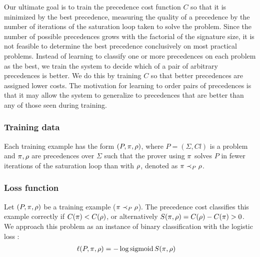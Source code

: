 Our ultimate goal is to train the precedence cost function $C$ so that it is minimized by the best precedence,
measuring the quality of a precedence by the number of iterations of the saturation loop taken to solve the problem.
Since the number of possible precedences grows with the factorial of the signature size,
it is not feasible to determine the best precedence conclusively on most practical problems.
Instead of learning to classify one or more precedences on each problem as the best,
we train the system to decide which of a pair of arbitrary precedences is better.
We do this by training $C$ so that better precedences are assigned lower costs.
The motivation for learning to order pairs of precedences
is that it may allow the system to generalize to precedences that are better than any of those seen during training.

\subsubsection{Training data}

Each training example has the form $(P, \pi, \rho)$,
where $P = (\Sigma, \mathit{Cl})$ is a problem
and $\pi, \rho$ are precedences over $\Sigma$
such that the prover using $\pi$ solves $P$ in fewer iterations of the saturation loop than with $\rho$,
denoted as $\pi \prec_{P} \rho$.

\subsubsection{Loss function}

Let $(P, \pi, \rho)$ be a training example ($\pi \prec_{P} \rho$).
The precedence cost classifies this example correctly if $C(\pi) < C(\rho)$,
or alternatively $S(\pi, \rho) = C(\rho) - C(\pi) > 0$.
We approach this problem as an instance of binary classification with the logistic loss \cite{Mohri2018}:
\begin{align*}
\ell(P, \pi, \rho)
&= - \log \operatorname{sigmoid} S(\pi, \rho)
\end{align*}

